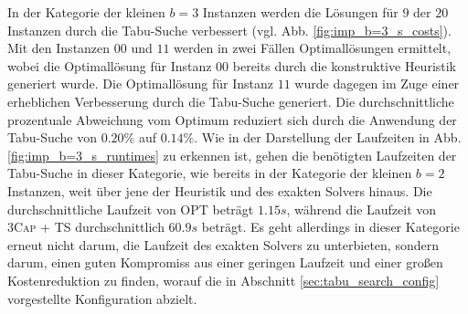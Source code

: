 In der Kategorie der kleinen $b = 3$ Instanzen werden die Lösungen für $9$ der $20$ Instanzen durch
die Tabu-Suche verbessert (vgl. Abb. \ref{fig:imp_b=3_s_costs}).
Mit den Instanzen $00$ und $11$ werden in zwei Fällen Optimallösungen ermittelt, wobei die Optimallösung
für Instanz $00$ bereits durch die konstruktive Heuristik generiert wurde. Die Optimallösung für Instanz $11$
wurde dagegen im Zuge einer erheblichen Verbesserung durch die Tabu-Suche generiert.
Die durchschnittliche prozentuale Abweichung vom Optimum reduziert sich durch die Anwendung der Tabu-Suche
von $0.20 \%$ auf $0.14 \%$.
Wie in der Darstellung der Laufzeiten in Abb. \ref{fig:imp_b=3_s_runtimes} zu erkennen ist, gehen die benötigten Laufzeiten der Tabu-Suche in dieser Kategorie, wie bereits in der Kategorie der kleinen $b = 2$ Instanzen,
weit über jene der Heuristik und des exakten Solvers hinaus.
Die durchschnittliche Laufzeit von \textsc{OPT} beträgt $1.15s$, während die Laufzeit von \textsc{3Cap + TS} durchschnittlich $60.9s$ beträgt. Es geht allerdings in dieser Kategorie erneut nicht darum, die Laufzeit des exakten
Solvers zu unterbieten, sondern darum, einen guten Kompromiss aus einer geringen Laufzeit und einer großen Kostenreduktion zu finden, worauf die in Abschnitt \ref{sec:tabu_search_config} vorgestellte Konfiguration
abzielt.

